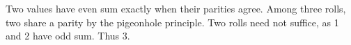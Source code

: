Two values have even sum exactly when their parities agree. Among three rolls, two share a parity by the pigeonhole principle. Two rolls need not suffice, as 1 and 2 have odd sum. Thus $\boxed3$.
